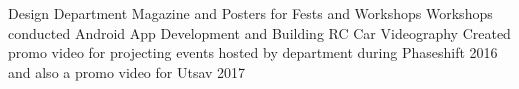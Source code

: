\begin{cvhonors}
  \cvhonor
    {Design}
    {Department Magazine and Posters for Fests and Workshops}
    {}
    {}
     \cvhonor
    {Workshops conducted}
    {Android App Development and Building RC Car}
    {}
    {}
     \cvhonor
    {Videography}
    {Created promo video for projecting events hosted by department during Phaseshift 2016 and also a promo video for Utsav 2017}
    {}
    {}
\end{cvhonors}

